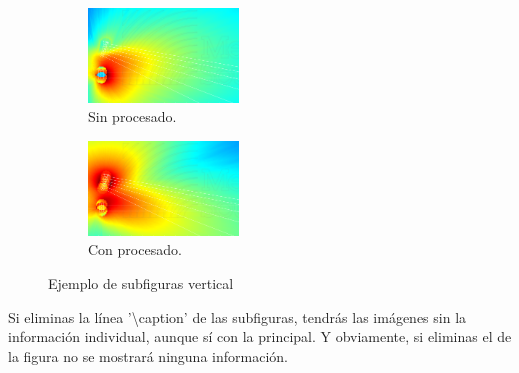 \begin{figure}[h]
    \centering
    \begin{subfigure}[b]{\textwidth}
    	\centering
        \includegraphics[width=4cm]{archivos/subs-sin}
        \caption{Sin procesado.}
        \label{fig:gull2}
    \end{subfigure}
    
    \begin{subfigure}[b]{\textwidth}
    	\centering
        \includegraphics[width=4cm]{archivos/subs-con}
        \caption{Con procesado.}
        \label{fig:tiger2}
    \end{subfigure}
    \caption{Ejemplo de subfiguras vertical}\label{sistemass2}
\end{figure}

Si eliminas la línea '\textbackslash caption' de las subfiguras, tendrás las imágenes sin la información individual, aunque sí con la principal. Y obviamente, si eliminas el de la figura no se mostrará ninguna información.